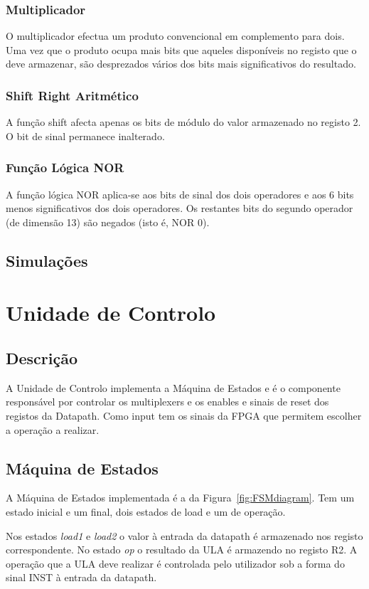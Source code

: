\documentclass[a4paper]{article}
\begin{document}
\subsubsection{Multiplicador}
O multiplicador efectua um produto convencional em complemento para dois. Uma vez que o produto ocupa mais bits que aqueles disponíveis no registo que o deve armazenar, são desprezados vários dos bits mais significativos do resultado.

\subsubsection{Shift Right Aritmético}
A função shift afecta apenas os bits de módulo do valor armazenado no registo 2. O bit de sinal permanece inalterado.

\subsubsection{Função Lógica NOR}
A função lógica NOR aplica-se aos bits de sinal dos dois operadores e aos 6 bits menos significativos dos dois operadores. Os restantes bits do segundo operador (de dimensão 13) são negados (isto é, NOR 0).

\pagebreak
\subsection{Simulações}
\pagebreak


\section{Unidade de Controlo}
\subsection{Descrição}
A Unidade de Controlo implementa a Máquina de Estados e é o componente responsável por controlar os multiplexers e os enables e sinais de reset dos registos da Datapath. Como input tem os sinais da FPGA que permitem escolher a operação a realizar.

\subsection{Máquina de Estados}
A Máquina de Estados implementada é a da Figura~\ref{fig:FSMdiagram}. Tem um estado inicial e um final, dois estados de load e um de operação.

Nos estados \textit{load1} e \textit{load2} o valor à entrada da datapath é armazenado nos registo correspondente. No estado \textit{op} o resultado da ULA é armazendo no registo R2. A operação que a ULA deve realizar é controlada pelo utilizador sob a forma do sinal INST à entrada da datapath.
\end{document}
